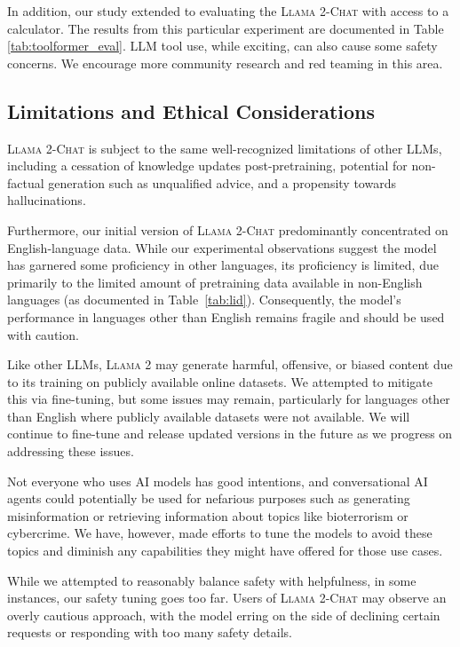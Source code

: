 \documentclass{article}
\newcommand{\modelname}{\textsc{Llama 2-Chat}\xspace}
\newcommand{\cinnamon}{\textsc{Llama 2}\xspace}
\begin{document}
In addition, our study extended to evaluating the \modelname{} with access to a calculator. The results from this particular experiment are documented in Table \ref{tab:toolformer_eval}. LLM tool use, while exciting, can also cause some safety concerns. We encourage more community research and red teaming in this area.

\subsection{Limitations and Ethical Considerations}
\label{sec:limitations}

\modelname{} is subject to the same well-recognized limitations of other LLMs, including a cessation of knowledge updates post-pretraining, potential for non-factual generation such as unqualified advice, and a propensity towards hallucinations.

Furthermore, our initial version of \modelname{} predominantly concentrated on English-language data. While our experimental observations suggest the model has garnered some proficiency in other languages, its proficiency is limited, due primarily to the limited amount of pretraining data available in non-English languages (as documented in Table~\ref{tab:lid}). Consequently, the model's performance in languages other than English remains fragile and should be used with caution.

Like other LLMs, \cinnamon may generate harmful, offensive, or biased content due to its training on publicly available online datasets. We attempted to mitigate this via fine-tuning, but some issues may remain, particularly for languages other than English where publicly available datasets were not available. We will continue to fine-tune and release updated versions in the future as we progress on addressing these issues.

Not everyone who uses AI models has good intentions, and conversational AI agents could potentially be used for nefarious purposes such as generating misinformation or retrieving information about topics like bioterrorism or cybercrime.  We have, however, made efforts to tune the models to avoid these topics and diminish any capabilities they might have offered for those use cases. 

While we attempted to reasonably balance safety with helpfulness, in some instances, our safety tuning goes too far. Users of \modelname{} may observe an overly cautious approach, with the model erring on the side of declining certain requests or responding with too many safety details. 
\end{document}
